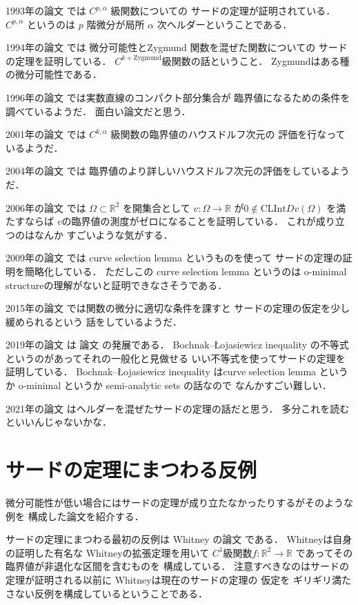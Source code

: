 \documentclass[leqno, a4paper, 12pt]{jsarticle}
\newcommand{\rr}{\mathbb{R}}
\newcommand{\cl}{\mathrm{CL}}
\newcommand{\nai}{\mathrm{Int}}
\begin{document}
1993年の論文
\cite{MR1112486}
では
$C^{p, \alpha}$
級関数についての
サードの定理が証明されている．
$C^{p, \alpha}$
というのは
$p$
階微分が局所
$\alpha$
次ヘルダーということである．


1994年の論文
\cite{MR1294335}
では
微分可能性とZygmund 関数を混ぜた関数についての
サードの定理を証明している．
$C^{k+\textrm{Zygmund}}$級関数の話ということ．
Zygmundはある種の微分可能性である．


1996年の論文
\cite{MR1390652}
では実数直線のコンパクト部分集合が
臨界値になるための条件を調べているようだ．
面白い論文だと思う．

2001年の論文
\cite{CGTT}
では
$C^{k, \alpha}$
級関数の臨界値のハウスドルフ次元の
評価を行なっているようだ．


2004年の論文
\cite{jiang2004general}
では
臨界値のより詳しいハウスドルフ次元の評価をしているようだ．


2006年の論文
\cite{Siberian}
では
$\Omega\subset \rr^{2}$
を開集合として
$v\colon\Omega\to \rr$
が$0\not \in \cl\nai Dv(\Omega)$
を満たすならば
$v$の臨界値の測度がゼロになることを証明している．
これが成り立つのはなんか
すごいような気がする．

2009年の論文
\cite{MR2515490}
では
curve selection lemma
というものを使って
サードの定理の証明を簡略化している．
ただしこの
curve selection lemma 
というのは
o-minimal structureの理解がないと証明できなさそうである．

2015年の論文
\cite{MR3859213}
では関数の微分に適切な条件を課すと
サードの定理の仮定を少し緩められるという
話をしているようだ．


2019年の論文
\cite{MR4060490}
は
論文
\cite{MR2515490}
の発展である．
Bochnak--{\L}ojasiewicz inequality 
の不等式というのがあってそれの一般化と見做せる
いい不等式を使ってサードの定理を証明している．
Bochnak--{\L}ojasiewicz inequality はcurve 
selection lemma 
というか
o-minimal 
というか
semi-analytic sets 
の話なので
なんかすごい難しい．


2021年の論文
\cite{MR4340761}
はヘルダーを混ぜたサードの定理の話だと思う．
多分これを読むといいんじゃないかな．


\section{サードの定理にまつわる反例}
微分可能性が低い場合にはサードの定理が成り立たなかったりするがそのような例を
構成した論文を紹介する．

サードの定理にまつわる最初の反例は
Whitney
の論文
\cite{MR1545896}
である．
Whitneyは自身の証明した有名な
Whitneyの拡張定理を用いて
$C^{1}$級関数$f\colon \rr^{2}\to \rr$
であってその臨界値が非退化な区間を含むものを
構成している．
注意すべきなのはサードの定理が証明される以前に
Whitneyは現在のサードの定理の
仮定を
ギリギリ満たさない反例を構成しているということである．
\end{document}
